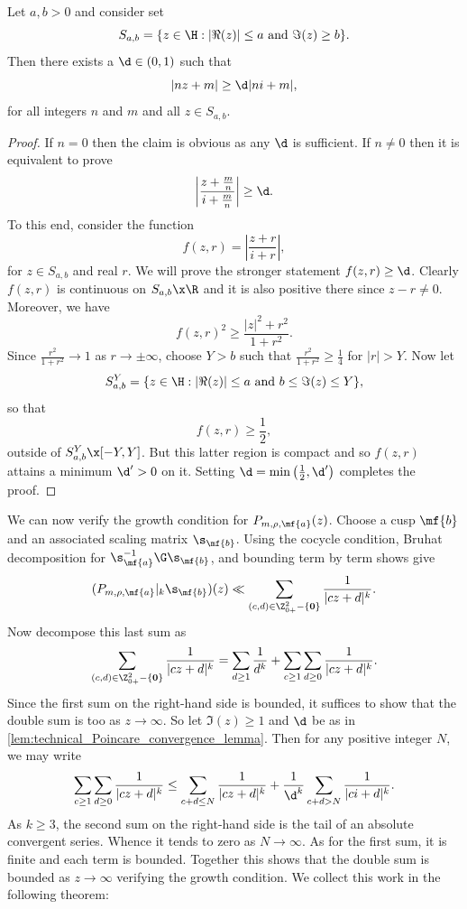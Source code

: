 \documentclass[12pt]{article}
\begin{document}
      \begin{lemma}\label{lem:technical_Poincare_convergence_lemma}
        Let \(a,b > 0\) and consider set
        \[
          S_{a,b} = \{z \in \H:|\Re(z)| \le a \text{ and } \Im(z) \ge b\}.
        \]
        Then there exists a \(\d \in (0,1)\) such that
        \[
          |nz+m| \ge \d|ni+m|,
        \]
        for all integers \(n\) and \(m\) and all \(z \in S_{a,b}\).
      \end{lemma}
      \begin{proof}
        If \(n = 0\) then the claim is obvious as any \(\d\) is sufficient. If \(n \neq 0\) then it is equivalent to prove
        \[
          \left|\frac{z+\frac{m}{n}}{i+\frac{m}{n}}\right| \ge \d.
        \]
        To this end, consider the function
        \[
          f(z,r) = \left|\frac{z+r}{i+r}\right|,
        \]
        for \(z \in S_{a,b}\) and real \(r\). We will prove the stronger statement \(f(z,r) \ge \d\). Clearly \(f(z,r)\) is continuous on \(S_{a,b} \x \R\) and it is also positive there since \(z-r \neq 0\). Moreover, we have
        \[
          f(z,r)^{2} \ge \frac{|z|^{2}+r^{2}}{1+r^{2}}.
        \]
        Since \(\frac{r^{2}}{1+r^{2}} \to 1\) as \(r \to \pm\infty\), choose \(Y > b\) such that \(\frac{r^{2}}{1+r^{2}} \ge \frac{1}{4}\) for \(|r| > Y\). Now let
        \[
          S_{a,b}^{Y} = \{z \in \H:|\Re(z)| \le a \text{ and } b \le \Im(z) \le Y\},
        \]
        so that
        \[
          f(z,r) \ge \frac{1}{2},
        \]
        outside of \(S_{a,b}^{Y} \x [-Y,Y]\). But this latter region is compact and so \(f(z,r)\) attains a minimum \(\d' > 0\) on it. Setting \(\d = \min\left(\frac{1}{2},\d'\right)\) completes the proof.
      \end{proof}

      We can now verify the growth condition for \(P_{m,\rho,\mf{a}}(z)\). Choose a cusp \(\mf{b}\) and an associated scaling matrix \(\s_{\mf{b}}\). Using the cocycle condition, Bruhat decomposition for \(\s_{\mf{a}}^{-1}\G\s_{\mf{b}}\), and bounding term by term shows give
      \[
        (P_{m,\rho,\mf{a}}|_{k}\s_{\mf{b}})(z) \ll \sum_{(c,d) \in \Z_{0+}^{2}-\{\mathbf{0}\}}\frac{1}{|cz+d|^{k}}.
      \]
      Now decompose this last sum as
      \[
        \sum_{(c,d) \in \Z_{0+}^{2}-\{\mathbf{0}\}}\frac{1}{|cz+d|^{k}} = \sum_{d \ge 1}\frac{1}{d^{k}}+\sum_{c \ge 1}\sum_{d \ge 0}\frac{1}{|cz+d|^{k}}.
      \]
      Since the first sum on the right-hand side is bounded, it suffices to show that the double sum is too as \(z \to \infty\). So let \(\Im(z) \ge 1\) and \(\d\) be as in \cref{lem:technical_Poincare_convergence_lemma}. Then for any positive integer \(N\), we may write
      \[
        \sum_{c \ge 1}\sum_{d \ge 0}\frac{1}{|cz+d|^{k}} \le \sum_{c+d \le N}\frac{1}{|cz+d|^{k}}+\frac{1}{\d^{k}}\sum_{c+d > N}\frac{1}{|ci+d|^{k}}.
      \]
      As \(k \ge 3\), the second sum on the right-hand side is the tail of an absolute convergent series. Whence it tends to zero as \(N \to \infty\). As for the first sum, it is finite and each term is bounded. Together this shows that the double sum is bounded as \(z \to \infty\) verifying the growth condition. We collect this work in the following theorem:
\end{document}
